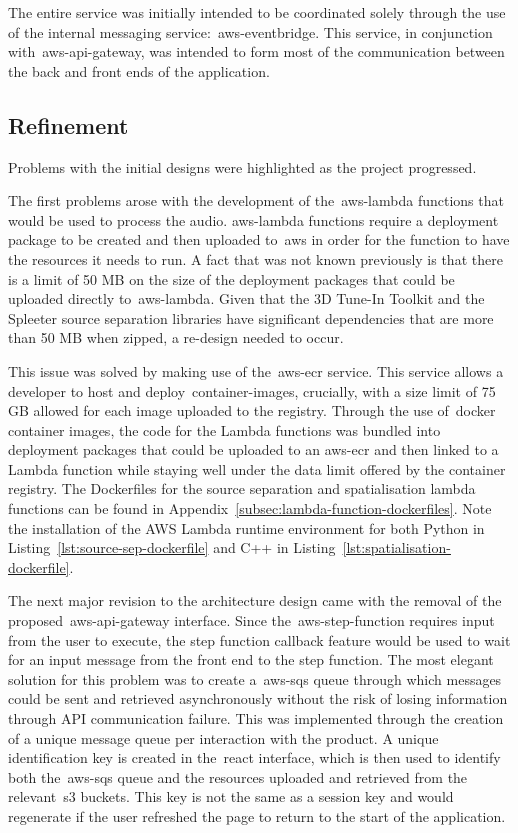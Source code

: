 The entire service was initially intended
to be coordinated solely through the use of the internal messaging service:~\gls{aws-eventbridge}.
This service, in conjunction with~\gls{aws-api-gateway},
was intended to form most of the communication between the back and front ends of the application.

\subsection{Refinement}\label{subsec:refinement}

Problems with the initial designs were highlighted as the project progressed.

The first problems arose with the development of the~\gls{aws-lambda} functions that would be used to process the audio.
\gls{aws-lambda} functions
require a deployment package to be created
and then uploaded to~\gls{aws} in order for the function to have the resources it needs to run.
A fact that was not known previously is that
there is a limit of 50 MB on the size of the deployment packages that could be uploaded directly to~\gls{aws-lambda}.
Given that the 3D Tune-In Toolkit and the Spleeter source separation libraries have significant dependencies
that are more than 50 MB when zipped, a re-design needed to occur.

This issue was solved by making use of the~\gls{aws-ecr} service.
This service allows a developer to host and deploy~\glspl{container-image},
crucially, with a size limit of 75 GB allowed for each image uploaded to the registry.
Through the use of~\gls{docker} container images,
the code for the Lambda functions was bundled into deployment packages
that could be uploaded to an
\gls{aws-ecr} and then linked to a Lambda function
while staying well under the data limit offered by the container registry.
The Dockerfiles for the source separation and spatialisation lambda functions can be found in Appendix~\ref{subsec:lambda-function-dockerfiles}.
Note the installation of the AWS Lambda runtime environment for both Python in Listing~\ref{lst:source-sep-dockerfile} and C++ in Listing~\ref{lst:spatialisation-dockerfile}.

The next major revision to the architecture design came with the removal of the proposed~\gls{aws-api-gateway} interface.
Since the~\gls{aws-step-function} requires input from the user to execute,
the step function callback feature would be used to wait for an input message from the front end to the step function.
The most elegant solution for this problem was
to create a~\gls{aws-sqs} queue through which messages could be sent
and retrieved asynchronously without the risk of losing information through API communication failure.
This was implemented through the creation of a unique message queue per interaction with the product.
A unique identification key is created in the~\gls{react} interface, which is then used
to identify both the~\gls{aws-sqs} queue and the resources uploaded and retrieved from the relevant~\gls{s3} buckets.
This key is not the same as a session key
and would regenerate if the user refreshed the page to return to the start of the application.

